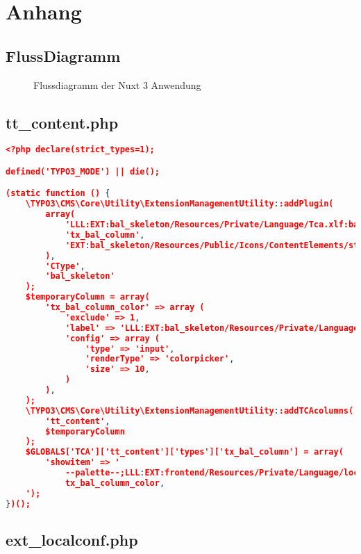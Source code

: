 \section{Anhang}

\subsection{FlussDiagramm}
\label{FlussDiagramm}
\begin{figure}[htb]
\centering
{}
\caption{Flussdiagramm der Nuxt 3 Anwendung}
\end{figure}
\clearpage

\pagebreak

\subsection{tt\_content.php}
\label{tt_content.php}

\begin{lstlisting}[language=json,firstnumber=1]
<?php declare(strict_types=1);

defined('TYPO3_MODE') || die();

(static function () {
    \TYPO3\CMS\Core\Utility\ExtensionManagementUtility::addPlugin(
        array(
            'LLL:EXT:bal_skeleton/Resources/Private/Language/Tca.xlf:bal_column.wizard.title',
            'tx_bal_column',
            'EXT:bal_skeleton/Resources/Public/Icons/ContentElements/stage.png'
        ),
        'CType',
        'bal_skeleton'
    );
    $temporaryColumn = array(
        'tx_bal_column_color' => array (
            'exclude' => 1,
            'label' => 'LLL:EXT:bal_skeleton/Resources/Private/Language/Tca.xlf:bal_column.color.title',
            'config' => array (
                'type' => 'input',
                'renderType' => 'colorpicker',
                'size' => 10,
            )
        ),
    );
    \TYPO3\CMS\Core\Utility\ExtensionManagementUtility::addTCAcolumns(
        'tt_content',
        $temporaryColumn
    );
    $GLOBALS['TCA']['tt_content']['types']['tx_bal_column'] = array(
        'showitem' => '
            --palette--;LLL:EXT:frontend/Resources/Private/Language/locallang_ttc.xml:palette.general;general,
            tx_bal_column_color,
    ');
})();
\end{lstlisting}

\subsection{ext\_localconf.php}
\label{ext_localconf.php}

